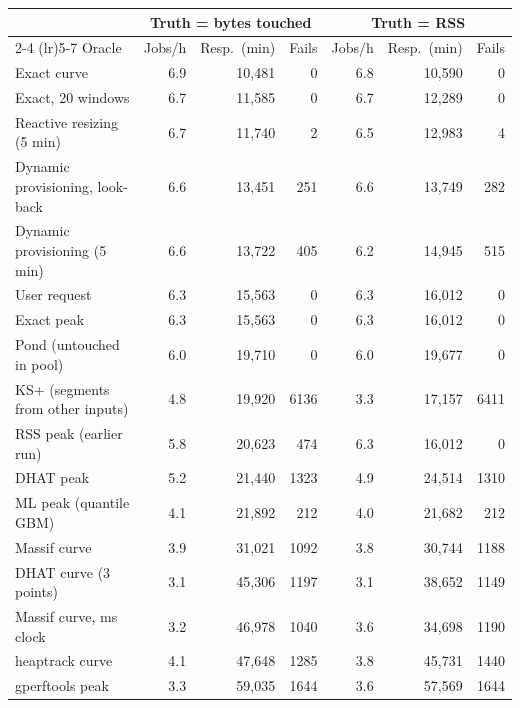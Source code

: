 \begin{tabular}{lrrrrrr}
\toprule
 & \multicolumn{3}{c}{Truth = bytes touched} & \multicolumn{3}{c}{Truth = RSS} \\
\cmidrule(lr){2-4} \cmidrule(lr){5-7}
Oracle & Jobs/h & Resp.\ (min) & Fails & Jobs/h & Resp.\ (min) & Fails \\
\midrule
Exact curve & 6.9 & 10{,}481 & 0 & 6.8 & 10{,}590 & 0 \\
Exact, 20 windows & 6.7 & 11{,}585 & 0 & 6.7 & 12{,}289 & 0 \\
Reactive resizing (5 min) & 6.7 & 11{,}740 & 2 & 6.5 & 12{,}983 & 4 \\
Dynamic provisioning, look-back & 6.6 & 13{,}451 & 251 & 6.6 & 13{,}749 & 282 \\
Dynamic provisioning (5 min) & 6.6 & 13{,}722 & 405 & 6.2 & 14{,}945 & 515 \\
User request & 6.3 & 15{,}563 & 0 & 6.3 & 16{,}012 & 0 \\
Exact peak & 6.3 & 15{,}563 & 0 & 6.3 & 16{,}012 & 0 \\
Pond (untouched in pool) & 6.0 & 19{,}710 & 0 & 6.0 & 19{,}677 & 0 \\
KS+ (segments from other inputs) & 4.8 & 19{,}920 & 6136 & 3.3 & 17{,}157 & 6411 \\
RSS peak (earlier run) & 5.8 & 20{,}623 & 474 & 6.3 & 16{,}012 & 0 \\
DHAT peak & 5.2 & 21{,}440 & 1323 & 4.9 & 24{,}514 & 1310 \\
ML peak (quantile GBM) & 4.1 & 21{,}892 & 212 & 4.0 & 21{,}682 & 212 \\
Massif curve & 3.9 & 31{,}021 & 1092 & 3.8 & 30{,}744 & 1188 \\
DHAT curve (3 points) & 3.1 & 45{,}306 & 1197 & 3.1 & 38{,}652 & 1149 \\
Massif curve, ms clock & 3.2 & 46{,}978 & 1040 & 3.6 & 34{,}698 & 1190 \\
heaptrack curve & 4.1 & 47{,}648 & 1285 & 3.8 & 45{,}731 & 1440 \\
gperftools peak & 3.3 & 59{,}035 & 1644 & 3.6 & 57{,}569 & 1644 \\
\bottomrule
\end{tabular}
